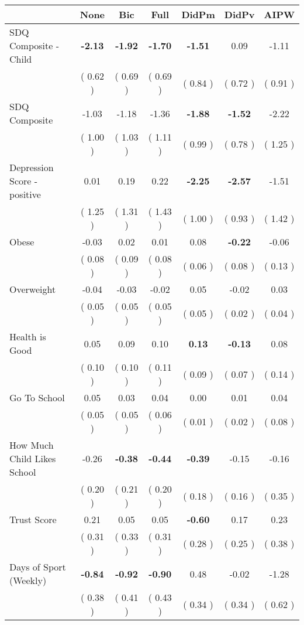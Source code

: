 \begin{tabular}{l c c c c c c}
\toprule
 & None & Bic & Full & DidPm & DidPv & AIPW \\
\midrule
SDQ Composite - Child & \textbf{     -2.13 } & \textbf{     -1.92 } & \textbf{     -1.70 } & \textbf{     -1.51 } &      0.09 &     -1.11 \\
& (     0.62 ) & (     0.69 ) & (     0.69 ) & (     0.84 ) & (     0.72 ) & (     0.91 ) \\
SDQ Composite &     -1.03 &     -1.18 &     -1.36 & \textbf{     -1.88 } & \textbf{     -1.52 } &     -2.22 \\
& (     1.00 ) & (     1.03 ) & (     1.11 ) & (     0.99 ) & (     0.78 ) & (     1.25 ) \\
Depression Score - positive &      0.01 &      0.19 &      0.22 & \textbf{     -2.25 } & \textbf{     -2.57 } &     -1.51 \\
& (     1.25 ) & (     1.31 ) & (     1.43 ) & (     1.00 ) & (     0.93 ) & (     1.42 ) \\
Obese &     -0.03 &      0.02 &      0.01 &      0.08 & \textbf{     -0.22 } &     -0.06 \\
& (     0.08 ) & (     0.09 ) & (     0.08 ) & (     0.06 ) & (     0.08 ) & (     0.13 ) \\
Overweight &     -0.04 &     -0.03 &     -0.02 &      0.05 &     -0.02 &      0.03 \\
& (     0.05 ) & (     0.05 ) & (     0.05 ) & (     0.05 ) & (     0.02 ) & (     0.04 ) \\
Health is Good &      0.05 &      0.09 &      0.10 & \textbf{      0.13 } & \textbf{     -0.13 } &      0.08 \\
& (     0.10 ) & (     0.10 ) & (     0.11 ) & (     0.09 ) & (     0.07 ) & (     0.14 ) \\
Go To School &      0.05 &      0.03 &      0.04 &      0.00 &      0.01 &      0.04 \\
& (     0.05 ) & (     0.05 ) & (     0.06 ) & (     0.01 ) & (     0.02 ) & (     0.08 ) \\
How Much Child Likes School &     -0.26 & \textbf{     -0.38 } & \textbf{     -0.44 } & \textbf{     -0.39 } &     -0.15 &     -0.16 \\
& (     0.20 ) & (     0.21 ) & (     0.20 ) & (     0.18 ) & (     0.16 ) & (     0.35 ) \\
Trust Score &      0.21 &      0.05 &      0.05 & \textbf{     -0.60 } &      0.17 &      0.23 \\
& (     0.31 ) & (     0.33 ) & (     0.31 ) & (     0.28 ) & (     0.25 ) & (     0.38 ) \\
Days of Sport (Weekly) & \textbf{     -0.84 } & \textbf{     -0.92 } & \textbf{     -0.90 } &      0.48 &     -0.02 &     -1.28 \\
& (     0.38 ) & (     0.41 ) & (     0.43 ) & (     0.34 ) & (     0.34 ) & (     0.62 ) \\
\bottomrule
\end{tabular}
